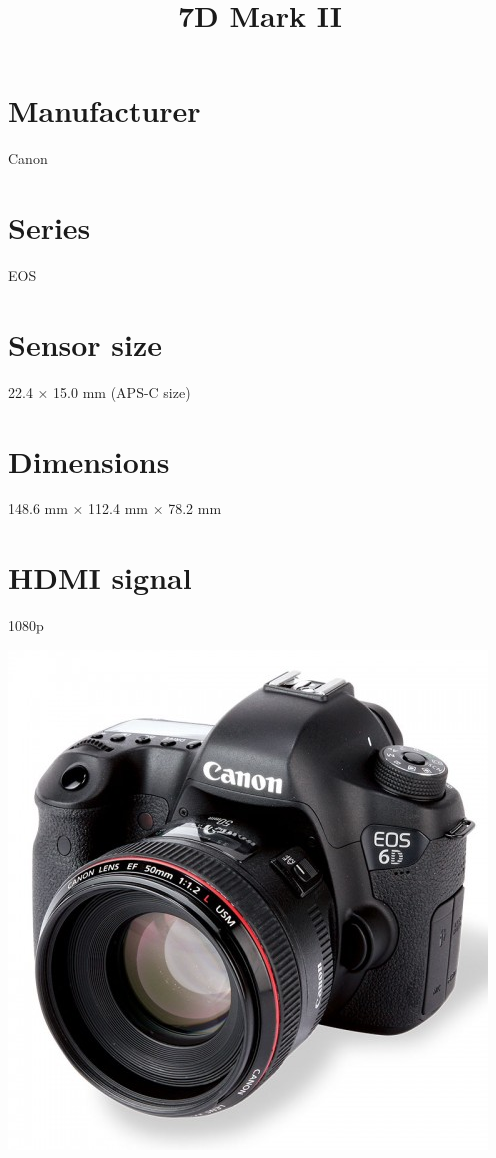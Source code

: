 \documentclass{article}
\begin{document}
\usepackage{titlesec}
\usepackage{graphicx}


\title{7D Mark II}
\section{Manufacturer}
Canon
\section{Series}
EOS
\section{Sensor size}
22.4 × 15.0 mm (APS-C size)
\section{Dimensions}
148.6 mm × 112.4 mm × 78.2 mm
\section{HDMI signal}
1080p


\includegraphics[width=\textwidth]{6d.jpg}
\end{document}
